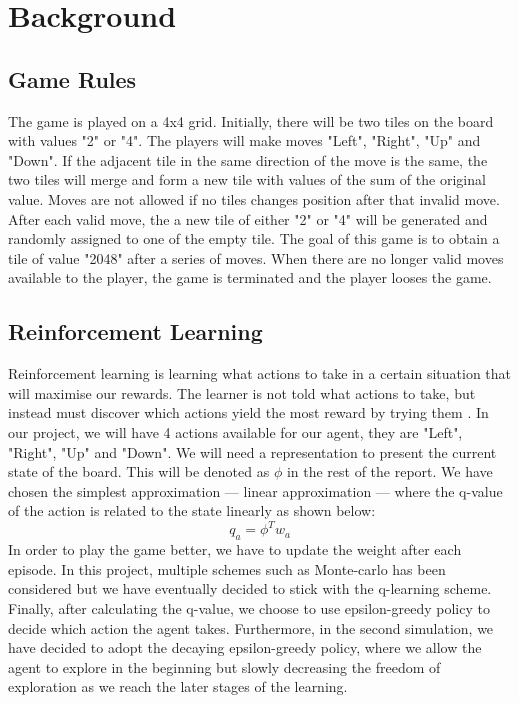 \section{Background}
\subsection{Game Rules}
The game is played on a 4x4 grid. Initially, there will be two tiles on the board with values "2" or "4".  The players will make moves "Left", "Right", "Up" and "Down". If the adjacent tile in the same direction of the move is the same, the two tiles will merge and form a new tile with values of the sum of the original value. Moves are not allowed if no tiles changes position after that invalid move. After each valid move, the a new tile of either "2" or "4" will be generated and randomly assigned to one of the empty tile. The goal of this game is to obtain a tile of value "2048" after a series of moves. When there are no longer valid moves available to the player, the game is terminated and the player looses the game.

\subsection{Reinforcement Learning}
Reinforcement learning is learning what actions to take in a certain situation  that will maximise our rewards. The learner is not told what actions to take, but instead must discover which actions yield the most reward by trying them \cite{sutton2018reinforcement}.  In our project, we will have 4 actions available for our agent, they are "Left", "Right", "Up" and "Down".  We will need a representation to present the current state of the board. This will be denoted as $\phi$ in the rest of the report. We have chosen the simplest approximation --- linear approximation --- where the q-value of the action  is related to the state linearly as shown below:
\begin{equation*}
q_{a} = \phi ^{T} w_{a}
\end{equation*}
In order to play the game better, we have to update the weight after each episode. In this project, multiple schemes such as Monte-carlo has been considered but we have eventually decided to stick with the q-learning scheme.
\\

Finally, after calculating the q-value, we choose to use epsilon-greedy policy to decide which action the agent takes. Furthermore,  in the second simulation, we have decided to adopt the decaying epsilon-greedy policy, where we allow the agent to explore in the beginning but slowly decreasing the freedom of exploration as we reach the later stages of the learning.